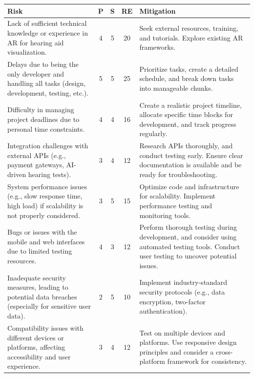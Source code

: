 \documentclass{article}
\begin{document}
\begin{table}[H]
    \centering
    \begin{tabularx}{\textwidth}{|X|c|c|c|X|}
        \hline
        \textbf{Risk} & \textbf{P} & \textbf{S} & \textbf{RE} & \textbf{Mitigation} \\
        \hline
        Lack of sufficient technical knowledge or experience in AR for hearing aid visualization. & 4 & 5 & 20 & Seek external resources, training, and tutorials. Explore existing AR frameworks. \\
        \hline
        Delays due to being the only developer and handling all tasks (design, development, testing, etc.). & 5 & 5 & 25 & Prioritize tasks, create a detailed schedule, and break down tasks into manageable chunks. \\
        \hline
        Difficulty in managing project deadlines due to personal time constraints. & 4 & 4 & 16 & Create a realistic project timeline, allocate specific time blocks for development, and track progress regularly. \\
        \hline
        Integration challenges with external APIs (e.g., payment gateways, AI-driven hearing tests). & 3 & 4 & 12 & Research APIs thoroughly, and conduct testing early. Ensure clear documentation is available and be ready for troubleshooting. \\
        \hline
        System performance issues (e.g., slow response time, high load) if scalability is not properly considered. & 3 & 5 & 15 & Optimize code and infrastructure for scalability. Implement performance testing and monitoring tools. \\
        \hline
        Bugs or issues with the mobile and web interfaces due to limited testing resources. & 4 & 3 & 12 & Perform thorough testing during development, and consider using automated testing tools. Conduct user testing to uncover potential issues. \\
        \hline
        Inadequate security measures, leading to potential data breaches (especially for sensitive user data). & 2 & 5 & 10 & Implement industry-standard security protocols (e.g., data encryption, two-factor authentication). \\
        \hline
        Compatibility issues with different devices or platforms, affecting accessibility and user experience. & 3 & 4 & 12 & Test on multiple devices and platforms. Use responsive design principles and consider a cross-platform framework for consistency. \\
        \hline

\end{tabularx}
\end{table}
\end{document}
